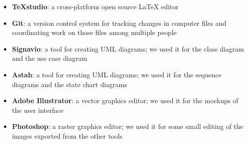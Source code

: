 \begin{itemize}
\item \textbf{TeXstudio}: a cross-platform open source LaTeX editor
\item \textbf{Git}: a version control system for tracking changes in computer files and coordinating work on those files among multiple people
\item \textbf{Signavio}: a tool for creating UML diagrams; we used it for the class diagram and the use case diagram
\item \textbf{Astah}: a tool for creating UML diagrams; we used it for the sequence diagrams and the state chart diagrams
\item \textbf{Adobe Illustrator}: a vector graphics editor; we used it for the mockups of the user interface
\item \textbf{Photoshop}: a raster graphics editor; we used it for some small editing of the images exported from the other tools
\end{itemize}